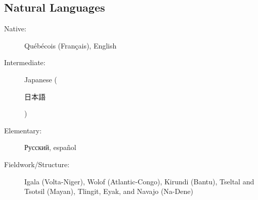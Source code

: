 \documentclass[margin,line]{resume}
\begin{document}
\begin{resume}
	\section{\mysidestyle Natural Languages}\vspace{2mm}
	\begin{description}
		\item[Native:] Québécois (Français), English
		\item[Intermediate:] Japanese (\begin{CJK}{UTF8}{min}日本語\end{CJK})
		\item[Elementary:] Русский, español
		\item[Fieldwork/Structure:] Igala (Volta-Niger), Wolof (Atlantic-Congo), Kirundi (Bantu),
		      Tseltal and Tsotsil (Mayan), Tlingit, Eyak, and Navajo (Na-Dene)%
	\end{description}

	\BgThispage

\end{resume}
\end{document}
